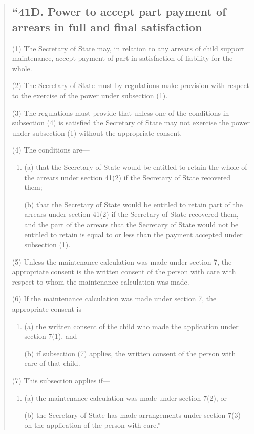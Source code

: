 \documentclass[a4paper]{article}
\begin{document}
\begin{quotation}
\subsection*{``41D. Power to accept part payment of arrears in full and final satisfaction}

(1) The 
Secretary of State
may, in relation to any arrears of child support  maintenance, accept payment of part in satisfaction of liability for the whole.

(2)
The Secretary of State must by regulations make provision with respect to the exercise of the power under subsection (1).

(3)
The regulations must provide that unless one of the conditions in subsection
(4)
is satisfied the 
Secretary of State %
may not exercise the power under subsection (1) without the appropriate consent.

(4)
The conditions are---
\begin{enumerate}\item[]
(a) that the 
Secretary of State %
would be entitled to retain the whole of the arrears under section 41(2) if 
the Secretary of State %
recovered them;

(b) that the 
Secretary of State %
would be entitled to retain part of the arrears under section 41(2) if 
the Secretary of State %
recovered them, and the part of the arrears that the 
Secretary of State %
would not be entitled to retain is equal to or less than the payment accepted under subsection (1).
\end{enumerate}

(5)
Unless the maintenance calculation was made under section 7, the appropriate consent is the written consent of the person with care with respect to whom the maintenance calculation was made.

(6)
If the maintenance calculation was made under section 7, the appropriate consent is---
\begin{enumerate}\item[]
(a) the written consent of the child who made the application under section 7(1), and

(b) if subsection (7) applies, the written consent of the person with care of that child.
\end{enumerate}

(7) This subsection applies if---
\begin{enumerate}\item[]
(a) the maintenance calculation was made under section 7(2), or

(b) the Secretary of State has made arrangements under section 7(3) on the application of the person with care.''
\end{enumerate}
\end{quotation}
\end{document}
